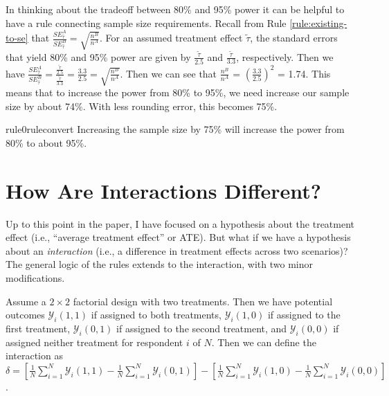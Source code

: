 \documentclass[12pt]{article}
\begin{document}
In thinking about the tradeoff between 80\% and 95\% power it can be helpful to have a rule connecting sample size requirements. 
Recall from
Rule \ref{rule:existing-to-se} that $\frac{SE_{\widehat{\tau}}^{A}}{SE_{\widehat{\tau}}^{B}} = \sqrt{\frac{n^{B}}{n^{A}}}$.
For an assumed treatment effect $\widetilde{\tau}$, the standard errors that yield 80\% and 95\% power are given by $\frac{\widetilde{\tau}}{2.5}$
and $\frac{\widetilde{\tau}}{3.3}$, respectively. 
Then we have $\frac{SE_{\widehat{\tau}}^{A}}{SE_{\widehat{\tau}}^{B}} = \frac{\frac{\widetilde{\tau}}{2.5}}{\frac{\widetilde{\tau}}{3.3}} = \frac{3.3}{2.5} = \sqrt{\frac{n^{B}}{n^{A}}}$.
Then we can see that $\frac{n^{B}}{n^{A}}$ = $\left( \frac{3.3}{2.5} \right)^{2}$ = 1.74. This means that to increase the power from 80\% to 95\%, we need increase our sample size by about 74\%. 
With less rounding error, this becomes 75\%.

\begin{restatable}[80\% to 95\% Power]{rule0}{ruleconvert}
\label{rule:80-to-95}
Increasing the sample size by 75\% will increase the power from 80\% to about 95\%.
\end{restatable}

\section*{How Are Interactions Different?}

Up to this point in the paper, I have focused on a hypothesis about the treatment effect (i.e., ``average treatment effect'' or ATE). 
But what if we have a hypothesis about an \emph{interaction} (i.e., a difference in treatment effects across two scenarios)? 
The general logic of the rules extends to the interaction, with two minor modifications.

Assume a $2 \times 2$ factorial design with two treatments. 
Then we have potential outcomes $\mathcal{Y}_{i}(1, 1)$ if assigned to both treatments, $\mathcal{Y}_{i}(1,0)$ if assigned to the first treatment, $\mathcal{Y}_{i}(0,1)$ if assigned to the second treatment, and $\mathcal{Y}_{i}(0,0)$ if assigned neither treatment for respondent $i$ of $N$. 
Then we can define the interaction as $\delta = \left\lbrack \frac{1}{N}\sum_{i = 1}^{N}{\mathcal{Y}_{i}(1,1)} - \frac{1}{N}\sum_{i = 1}^{N}{\mathcal{Y}_{i}(0,1)} \right\rbrack - \left\lbrack \frac{1}{N}\sum_{i = 1}^{N}{\mathcal{Y}_{i}(1,0)}- \frac{1}{N}\sum_{i = 1}^{N}{\mathcal{Y}_{i}(0,0)} \right\rbrack$.
\end{document}
